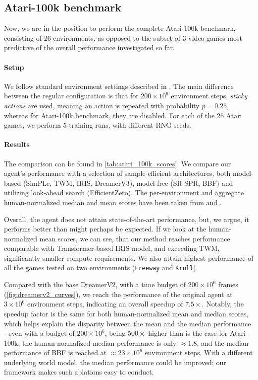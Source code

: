 \documentclass[en]{pracamgr}
\newcommand{\env}[1]{{\tt #1}}
\begin{document}
\subsection{Atari-100k benchmark}

Now, we are in the position to perform the complete Atari-100k benchmark, consisting of 26 environments, as opposed to the subset of 3 video games most predictive of the overall performance investigated so far.

\paragraph{Setup} We follow standard environment settings described in \autocite{kaiserModelBasedReinforcementLearning2024}. The main difference between the regular configuration is that for $200\times 10^6$ environment steps, \emph{sticky actions} are used, meaning an action is repeated with probability $p=0.25$, whereas for Atari-100k benchmark, they are disabled. For each of the 26 Atari games, we perform $5$ training runs, with different RNG seeds.

\paragraph{Results} The comparison  can be found in \autoref{tab:atari_100k_scores}. We compare our agent's performance with a selection of sample-efficient architectures, both model-based (SimPLe, TWM, IRIS, DreamerV3), model-free (SR-SPR, BBF) and utilizing look-ahead search (EfficientZero). The per-environment and aggregate human-normalized median and mean scores have been taken from \autocite{hafnerMasteringDiverseDomains2024} and \autocite{schwarzerBiggerBetterFaster2023}.

Overall, the agent does not attain state-of-the-art performance, but, we argue, it performs better than might perhaps be expected. If we look at the human-normalized mean scores, we can see, that our method reaches performance comparable with Transformer-based IRIS model, and exceeding TWM, significantly smaller compute requirements. We also attain highest performance of all the games tested on two environments (\env{Freeway} and \env{Krull}).

Compared with the base DreamerV2, with a time budget of $200 \times 10^6$ frames (\autoref{fig:dreamerv2_curves}), we reach the performance of the original agent at $3 \times 10^6$ environment steps, indicating an overall speedup of $7.5 \times$. Notably, the speedup factor is the same for both human-normalized mean and median scores, which helps explain the disparity between the mean and the median performance - even with a budget of $200 \times 10^6$, being $500\times$ higher than is the case for Atari-100k, the human-normalized median performance is only $\approx 1.8$, and the median performance of BBF is reached at $\approx 23 \times 10^6$ environment steps. With a different underlying world model, the median performance could be improved; our framework makes such ablations easy to conduct.
\end{document}
